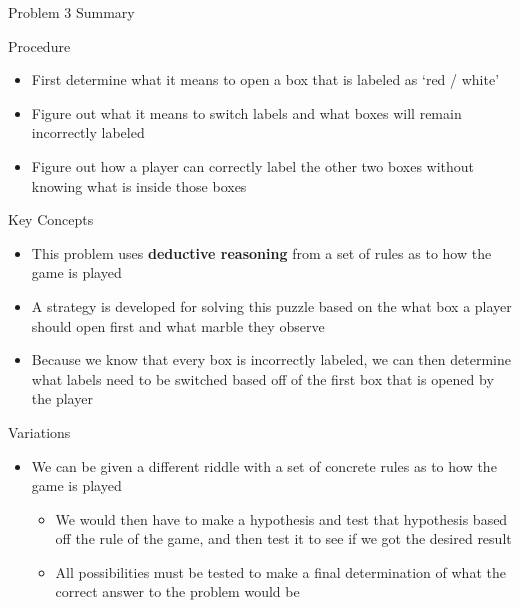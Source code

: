 \begin{summary}{Problem 3 Summary}
    \begin{statement}{Procedure}
        \begin{itemize}
            \item First determine what it means to open a box that is labeled as `red / white'
            \item Figure out what it means to switch labels and what boxes will remain incorrectly labeled
            \item Figure out how a player can correctly label the other two boxes without knowing what is inside those boxes
        \end{itemize}
    \end{statement}
    \begin{statement}{Key Concepts}
        \begin{itemize}
            \item This problem uses \textbf{deductive reasoning} from a set of rules as to how the game is played
            \item A strategy is developed for solving this puzzle based on the what box a player should open first and what marble they observe
            \item Because we know that every box is incorrectly labeled, we can then determine what labels need to be switched based off of the first box that is opened by the player
        \end{itemize}
    \end{statement}
    \begin{statement}{Variations}
        \begin{itemize}
            \item We can be given a different riddle with a set of concrete rules as to how the game is played
            \begin{itemize}
                \item We would then have to make a hypothesis and test that hypothesis based off the rule of the game, and then test it to see if we got the desired result
                \item All possibilities must be tested to make a final determination of what the correct answer to the problem would be
            \end{itemize}
        \end{itemize}
    \end{statement}
\end{summary}

